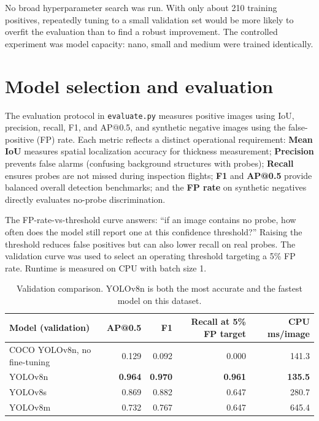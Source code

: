 \documentclass[11pt,a4paper]{article}
\begin{document}
No broad hyperparameter search was run. With only about 210 training positives, repeatedly tuning to a small validation set would be more likely to overfit the evaluation than to find a robust improvement. The controlled experiment was model capacity: nano, small and medium were trained identically.

\section{Model selection and evaluation}

The evaluation protocol in \texttt{evaluate.py} measures positive images using IoU, precision, recall, F1, and AP@0.5, and synthetic negative images using the false-positive (FP) rate. Each metric reflects a distinct operational requirement: \textbf{Mean IoU} measures spatial localization accuracy for thickness measurement; \textbf{Precision} prevents false alarms (confusing background structures with probes); \textbf{Recall} ensures probes are not missed during inspection flights; \textbf{F1} and \textbf{AP@0.5} provide balanced overall detection benchmarks; and the \textbf{FP rate} on synthetic negatives directly evaluates no-probe discrimination.

The FP-rate-vs-threshold curve answers: ``if an image contains no probe, how often does the model still report one at this confidence threshold?'' Raising the threshold reduces false positives but can also lower recall on real probes. The validation curve was used to select an operating threshold targeting a 5\% FP rate. Runtime is measured on CPU with batch size 1.

\begin{table}[H]
\centering
\small
\begin{tabular}{lrrrr}
\toprule
Model (validation) & AP@0.5 & F1 & Recall at 5\% FP target & CPU ms/image \\
\midrule
COCO YOLOv8n, no fine-tuning & 0.129 & 0.092 & 0.000 & 141.3 \\
YOLOv8n & \textbf{0.964} & \textbf{0.970} & \textbf{0.961} & \textbf{135.5} \\
YOLOv8s & 0.869 & 0.882 & 0.647 & 280.7 \\
YOLOv8m & 0.732 & 0.767 & 0.647 & 645.4 \\
\bottomrule
\end{tabular}
\caption{Validation comparison. YOLOv8n is both the most accurate and the fastest model on this dataset.}
\end{table}
\end{document}
